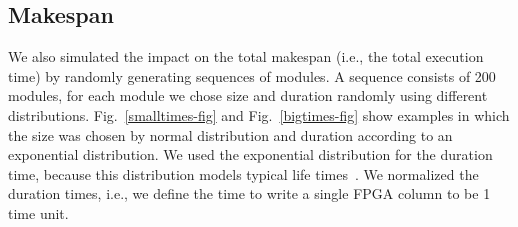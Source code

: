 \documentclass{article}
\begin{document}
\subsection{Makespan}

\newlength{\makespanfig}
\setlength{\makespanfig}{60mm}
\def\makespanspace{\hspace{-5mm}}


\begin{figure*}[p]
\mbox{}\makespanspace
{}\makespanspace
{}\makespanspace
{}\makespanspace
\mbox{}

\caption{Comparison of makespans for schedules using tabu search, greedy, and no fragmentation for an array of size $\ell=200$.
The average module size is fixed to 10, 50, and 150 columns,
the average duration time ranges from 1 to 400 time units.
The $y$-axis shows the total makespan in time units.
\label{smalltimes-fig}}
\end{figure*}

\begin{figure*}[]
\mbox{}\makespanspace
{}\makespanspace
{}\makespanspace
{}\makespanspace
\mbox{}
\caption{Comparison of makespans for schedules using tabu search, greedy, and no fragmentation for an array of size $\ell=200$.
The average module size is fixed to 10, 50, and 100 columns,
the average duration time ranges from 600 to 3000 time units.
The $y$-axis shows the total makespan in time units.
\label{bigtimes-fig}}
\end{figure*}


We also simulated the impact on the total makespan (i.e., the total
execution time) by randomly generating sequences of modules. A
sequence consists of 200 modules, for each module we chose size and
duration randomly using different distributions. 
Fig.~\ref{smalltimes-fig} and Fig.~\ref{bigtimes-fig} show examples
in which the size was chosen by normal distribution and duration according to an 
exponential distribution.  We used the exponential distribution for
the duration time, because this distribution models typical life
times~\cite{bn-gs-95}.
We normalized the duration times, i.e.,
we define the time to write a single FPGA column to be 1 time unit.
\end{document}
